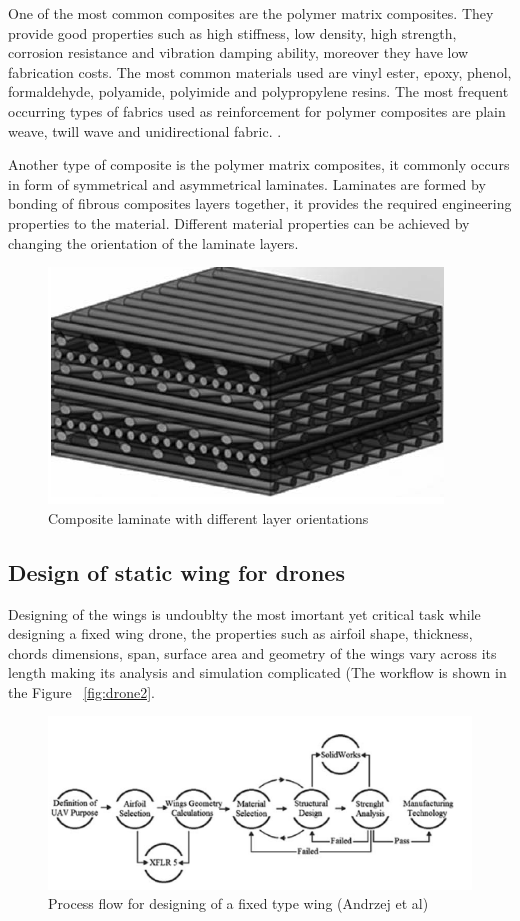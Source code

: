 \documentclass{article}
\begin{document}
One of the most common composites are the polymer matrix composites. They provide good properties such as high stiffness, low density, high strength, corrosion resistance and vibration damping ability, moreover they have low  fabrication costs. The most common materials used are vinyl ester, epoxy, phenol, formaldehyde, polyamide, polyimide and polypropylene  resins. The most frequent occurring types of fabrics used as reinforcement for polymer composites are plain weave, twill wave and unidirectional fabric. \citep{krolikowski}.

Another type of composite is the polymer matrix composites, it commonly occurs in form of symmetrical and asymmetrical laminates. Laminates are formed by bonding of fibrous composites layers together, it provides the required engineering properties to the material. Different material properties can be achieved by changing the orientation of the laminate layers.

\begin{figure}[h!]
\centering
\includegraphics[scale=0.5]{dfm2}
\caption{ Composite laminate with different layer orientations}
\end{figure}
\subsection{Design of static wing for drones}

Designing of the wings is undoublty the most imortant yet critical task while designing a fixed wing drone, the properties such as airfoil shape, thickness, chords dimensions, span, surface area and geometry of the wings vary across its length making its analysis and simulation complicated (The workflow is shown in the  Figure ~\ref{fig:drone2}.
\begin{figure}[h!]
\centering
\includegraphics[scale=0.5]{workflow.png}
\caption{Process flow for designing of a fixed type wing (Andrzej et al)}
\end{figure}
\end{document}
